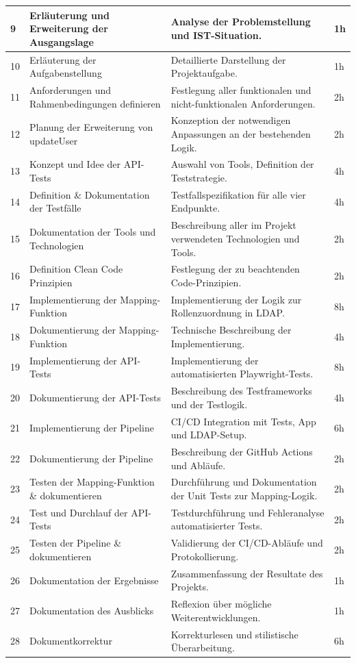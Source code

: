\begin{longtable}{|l|p{}|p{}|l|}
  \hline
  9 & Erläuterung und Erweiterung der Ausgangslage & Analyse der Problemstellung und IST-Situation. & 1h \\
  \hline
  10 & Erläuterung der Aufgabenstellung & Detaillierte Darstellung der Projektaufgabe. & 1h \\
  \hline
  11 & Anforderungen und Rahmenbedingungen definieren & Festlegung aller funktionalen und nicht-funktionalen Anforderungen. & 2h \\
  \hline
  12 & Planung der Erweiterung von updateUser & Konzeption der notwendigen Anpassungen an der bestehenden Logik. & 2h \\
  \hline
  13 & Konzept und Idee der API-Tests & Auswahl von Tools, Definition der Teststrategie. & 4h \\
  \hline
  14 & Definition \& Dokumentation der Testfälle & Testfallspezifikation für alle vier Endpunkte. & 4h \\
  \hline
  15 & Dokumentation der Tools und Technologien & Beschreibung aller im Projekt verwendeten Technologien und Tools. & 2h \\
  \hline
  16 & Definition Clean Code Prinzipien & Festlegung der zu beachtenden Code-Prinzipien. & 2h \\
  \hline
  17 & Implementierung der Mapping-Funktion & Implementierung der Logik zur Rollenzuordnung in LDAP. & 8h \\
  \hline
  18 & Dokumentierung der Mapping-Funktion & Technische Beschreibung der Implementierung. & 4h \\
  \hline
  19 & Implementierung der API-Tests & Implementierung der automatisierten Playwright-Tests. & 8h \\
  \hline
  20 & Dokumentierung der API-Tests & Beschreibung des Testframeworks und der Testlogik. & 4h \\
  \hline
  21 & Implementierung der Pipeline & CI/CD Integration mit Tests, App und LDAP-Setup. & 6h \\
  \hline
  22 & Dokumentierung der Pipeline & Beschreibung der GitHub Actions und Abläufe. & 2h \\
  \hline
  23 & Testen der Mapping-Funktion \& dokumentieren & Durchführung und Dokumentation der Unit Tests zur Mapping-Logik. & 2h \\
  \hline
  24 & Test und Durchlauf der API-Tests & Testdurchführung und Fehleranalyse automatisierter Tests. & 2h \\
  \hline
  25 & Testen der Pipeline \& dokumentieren & Validierung der CI/CD-Abläufe und Protokollierung. &  2h\\
  \hline
  26 & Dokumentation der Ergebnisse & Zusammenfassung der Resultate des Projekts. & 1h \\
  \hline
  27 & Dokumentation des Ausblicks & Reflexion über mögliche Weiterentwicklungen. & 1h \\
  \hline
  28 & Dokumentkorrektur & Korrekturlesen und stilistische Überarbeitung. & 6h \\
  \hline
\end{longtable}
